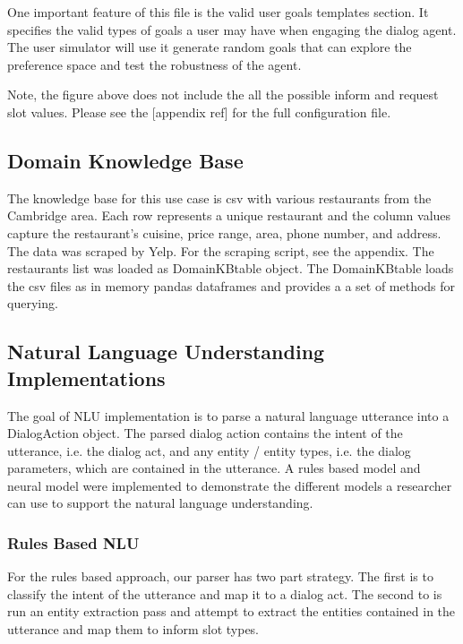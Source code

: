 One important feature of this file is the valid user goals templates section. It specifies the valid types of goals a user may have when engaging the dialog agent. The user simulator will use it generate random goals that can explore the preference space and test the robustness of the agent. 

Note, the figure above does not include the all the possible inform and request slot values. Please see the [appendix ref] for the full configuration file.  

\subsection{Domain Knowledge Base }

The knowledge base for this use case is csv with various restaurants from the Cambridge area. Each row represents a unique restaurant and the column values capture the restaurant's cuisine, price range, area, phone number, and address. The data was scraped by Yelp. For the scraping script, see the appendix. The restaurants list was loaded as DomainKBtable object. The DomainKBtable loads the csv files as in memory pandas dataframes and provides a a set of methods for querying. 

\subsection{Natural Language Understanding Implementations}

The goal of NLU implementation is to parse a natural language utterance into a DialogAction object. The parsed dialog action contains the intent of the utterance, i.e. the dialog act, and any entity / entity types, i.e. the dialog parameters, which are contained in the utterance. A rules based model and neural model were implemented to demonstrate the different models a researcher can use to support the natural language understanding. 

\subsubsection{Rules Based NLU}

For the rules based approach, our parser has two part strategy. The first is to classify the intent of the utterance and map it to a dialog act. The second to is run an entity extraction pass and attempt to extract the entities contained in the utterance and map them to inform slot types. 

